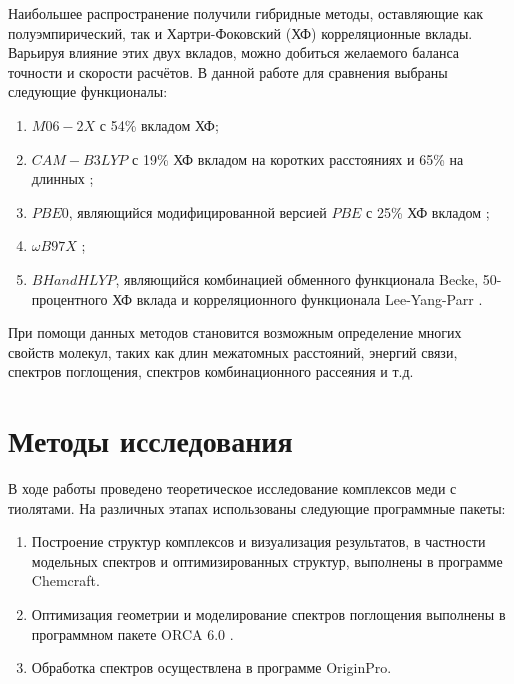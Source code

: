 \documentclass[a4paper,12pt]{article}
\newcommand{\ths}{\thinspace}
\begin{document}
\begin{onehalfspace}
	Наибольшее распространение получили гибридные методы, оставляющие как полуэмпирический, так и Хартри-Фоковский (ХФ) корреляционные вклады. Варьируя влияние этих двух вкладов, можно добиться желаемого баланса точности и скорости расчётов. В данной работе для сравнения выбраны следующие функционалы:
	\begin{enumerate}
		\item $M06-2X$ с 54\% вкладом ХФ;
		\item $CAM-B3LYP$ с 19\% ХФ вкладом на коротких расстояниях и 65\% на длинных  \cite{Yanai2004};
		\item $PBE0$, являющийся модифицированной версией $PBE$ \cite{Perdew1996} с 25\% ХФ вкладом \cite{Ernzerhof1999};
		\item $\omega B97X$  \cite{Chai2008};
		\item $BHandHLYP$, являющийся комбинацией обменного функционала Becke, 50-процентного ХФ вклада и корреляционного функционала Lee-Yang-Parr \cite{Parr1989}.
	\end{enumerate}
	
	При помощи данных методов становится возможным определение многих свойств молекул, таких как длин межатомных расстояний, энергий связи, спектров поглощения, спектров комбинационного рассеяния и т.д.
	
	
	
	\newpage
	
	\section*{Методы исследования}
	
	В ходе работы проведено теоретическое исследование комплексов меди с тиолятами. На различных этапах использованы следующие программные пакеты:
	\begin{enumerate}
		\item Построение структур комплексов и визуализация результатов, в частности модельных спектров и оптимизированных структур, выполнены в программе Chemcraft\ths1.8.
		\item Оптимизация геометрии и моделирование спектров поглощения выполнены в программном пакете ORCA 6.0 \cite{ORCA6}.
		\item Обработка спектров осуществлена в программе OriginPro\ths2024.
	\end{enumerate}
	

\end{onehalfspace}
\end{document}
